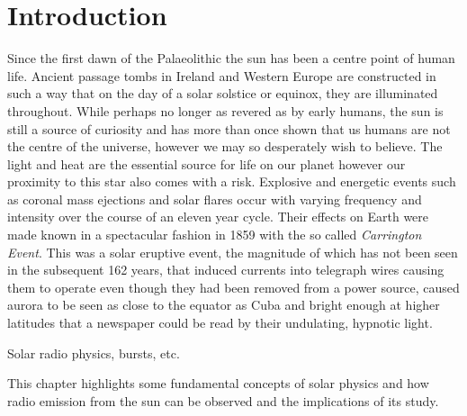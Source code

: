 \doublespacing
\chapter{Introduction}
\label{chap:intro}
Since the first dawn of the Palaeolithic the sun has been a centre point of human life. Ancient passage tombs in Ireland and Western Europe are constructed in such a way that on the day of a solar solstice or equinox, they are illuminated throughout. While perhaps no longer as revered as by early humans, the sun is still a source of curiosity and has more than once shown that us humans are not the centre of the universe, however we may so desperately wish to believe. The light and heat are the essential source for life on our planet however our proximity to this star also comes with a risk. Explosive and energetic events such as coronal mass ejections and solar flares occur with varying frequency and intensity over the course of an eleven year cycle. Their effects on Earth were made known in a spectacular fashion in 1859 with the so called \textit{Carrington Event}. This was a solar eruptive event, the magnitude of which has not been seen in the subsequent 162 years, that induced currents into telegraph wires causing them to operate even though they had been removed from a power source, caused aurora to be seen as close to the equator as Cuba and bright enough at higher latitudes that a newspaper could be read by their undulating, hypnotic light. 

Solar radio physics, bursts, etc.

This chapter highlights some fundamental concepts of solar physics  and how radio emission from the sun can be observed and the implications of its study.

